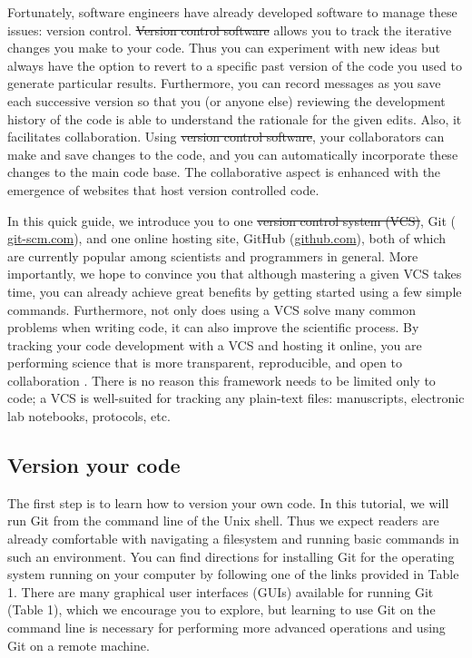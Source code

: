\documentclass[10pt]{article}
\providecommand{\DIFaddtex}[1]{{\protect\color{blue}\uwave{#1}}} %
\providecommand{\DIFdeltex}[1]{{\protect\color{red}\sout{#1}}}                      %
\providecommand{\DIFaddbegin}{} %
\providecommand{\DIFaddend}{} %
\providecommand{\DIFdelbegin}{} %
\providecommand{\DIFdelend}{} %
\providecommand{\DIFadd}[1]{\texorpdfstring{\DIFaddtex{#1}}{#1}} %
\providecommand{\DIFdel}[1]{\texorpdfstring{\DIFdeltex{#1}}{}} %
\begin{document}
Fortunately, software engineers have already developed software to manage these issues: version control.
\DIFdelbegin \DIFdel{Version control software }\DIFdelend \DIFaddbegin \DIFadd{A version control system (VCS) }\DIFaddend allows you to track the iterative changes you make to your code.
Thus you can experiment with new ideas but always have the option to revert to a specific past version of the code you used to generate particular results.
Furthermore, you can record messages as you save each successive version so that you (or anyone else) reviewing the development history of the code is able to understand the rationale for the given edits.
Also, it facilitates collaboration.
Using \DIFdelbegin \DIFdel{version control software}\DIFdelend \DIFaddbegin \DIFadd{a VCS}\DIFaddend , your collaborators can make and save changes to the code, and you can automatically incorporate these changes to the main code base.
The collaborative aspect is enhanced with the emergence of websites that host version controlled code.

In this quick guide, we introduce you to one \DIFdelbegin \DIFdel{version control system (VCS)}\DIFdelend \DIFaddbegin \DIFadd{VCS}\DIFaddend , Git (\DIFdelbegin %
\DIFdelend \DIFaddbegin \href{https://git-scm.com/}{git-scm.com}\DIFaddend ), and one online hosting site, GitHub (\href{https://github.com}{github.com}), both of which are currently popular among scientists and programmers in general.
More importantly, we hope to convince you that although mastering a given VCS takes time, you can already achieve great benefits by getting started using a few simple commands.
Furthermore, not only does using a VCS solve many common problems when writing code, it can also improve the scientific process.
By tracking your code development with a VCS and hosting it online, you are performing science that is more transparent, reproducible, and open to collaboration \cite{23448176, 24415924}.
There is no reason this framework needs to be limited only to code; a VCS is well-suited for tracking any plain-text files: manuscripts, electronic lab notebooks, protocols, etc.


\subsection{Version your code}

The first step is to learn how to version your own code.
In this tutorial, we will run Git from the command line of the Unix shell.
Thus we expect readers are already comfortable with navigating a filesystem and running basic commands in such an environment.
You can find directions for installing Git for the operating system running on your computer by following one of the links provided in Table 1.
There are many graphical user interfaces (GUIs) available for running Git (Table 1), which we encourage you to explore, but learning to use Git on the command line is necessary for performing more advanced operations and using Git on a remote machine.
\end{document}
